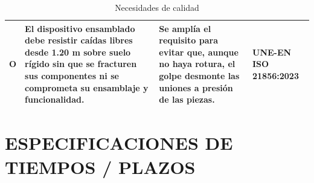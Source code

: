 \documentclass[11pt,a4paper]{article}
\begin{document}
\begin{table}[H]
\begin{tabular}{|p{2.8cm}|p{5.5cm}|p{2.5cm}|p{3.0cm}|}
\hline
O & El dispositivo ensamblado debe resistir caídas libres desde 1.20 m sobre suelo rígido sin que se fracturen sus componentes ni se comprometa su ensamblaje y funcionalidad. & Se amplía el requisito para evitar que, aunque no haya rotura, el golpe desmonte las uniones a presión de las piezas. & UNE-EN ISO 21856:2023 \\
\hline
\end{tabular}
\caption{Necesidades de calidad}
\end{table}

\newpage


\section{ESPECIFICACIONES DE TIEMPOS / PLAZOS}


\vspace{0.5cm}
\end{document}
